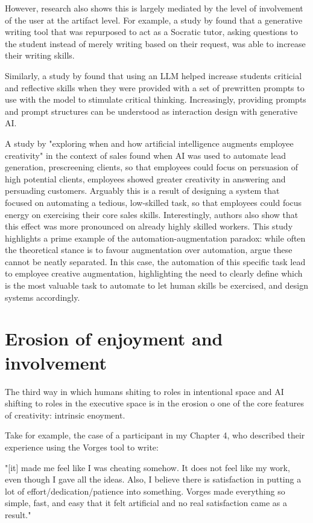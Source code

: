 However, research also shows this is largely mediated by the level of involvement of the user at the artifact level. For example, a study by \cite{Kim2023-wt} found that a generative writing tool that was repurposed to act as a Socratic tutor, asking questions to the student instead of merely writing based on their request, was able to increase their writing skills. 

Similarly, a study by \cite{Essel2024-qc} found that using an LLM helped increase students criticial and reflective skills when they were provided with a set of prewritten prompts to use with the model to stimulate critical thinking. Increasingly, providing prompts and prompt structures can be understood as interaction design with generative AI. 

A study by \cite{Jia2024-vp} "exploring when and how artificial intelligence augments employee creativity" in the context of sales found when AI was used to automate lead generation, prescreening clients, so that employees could focus on persuasion of high potential clients, employees showed greater creativity in answering and persuading customers. Arguably this is a result of designing a system that focused on automating a tedious, low-skilled task, so that employees could focus energy on exercising their core sales skills. Interestingly, authors also show that this effect was more pronounced on already highly skilled workers. This study highlights a prime example of the automation-augmentation paradox: while often the theoretical stance is to favour augmentation over automation, \cite{Raisch2021-nw} argue these cannot be neatly separated. In this case, the automation of this specific task lead to employee creative augmentation, highlighting the need to clearly define which is the most valuable task to automate to let human skills be exercised, and design systems accordingly.  

\section{Erosion of enjoyment and involvement}

The third way in which humans shiting to roles in intentional space and AI shifting to roles in the executive space is in the erosion o one of the core features of creativity: intrinsic enoyment. 

Take for example, the case of a participant in my Chapter 4, who described their experience using the Vorges tool to write:

 "[it] made me feel like I was cheating somehow. It does not feel like my work, even though I gave all the ideas. Also, I believe there is satisfaction in putting a lot of effort/dedication/patience into something. Vorges made everything so simple, fast, and easy that it felt artificial and no real satisfaction came as a result." 

